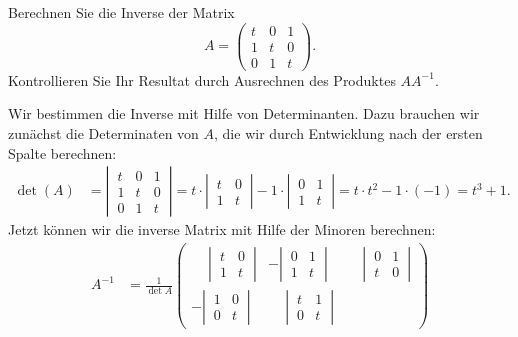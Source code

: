 Berechnen Sie die Inverse der Matrix
\[
A
=
\begin{pmatrix}
t&0&1\\
1&t&0\\
0&1&t
\end{pmatrix}.
\]
Kontrollieren Sie Ihr Resultat durch Ausrechnen des Produktes $AA^{-1}$.


\begin{loesung}
Wir bestimmen die Inverse mit Hilfe von Determinanten.
Dazu brauchen wir zunächst die Determinaten von $A$, die wir durch Entwicklung
nach der ersten Spalte berechnen:
\begin{align*}
\det(A)
&=
\left|\,\begin{matrix}
t&0&1\\
1&t&0\\
0&1&t
\end{matrix}\,\right|
=
t\cdot\left|\,\begin{matrix}t&0\\1&t\end{matrix}\,\right|
-1\cdot\left|\,\begin{matrix}0&1\\1&t\end{matrix}\,\right|
=
t\cdot t^2-1\cdot(-1)=t^3+1.
\end{align*}
Jetzt können wir die inverse Matrix mit Hilfe der Minoren berechnen:
\begin{align}
A^{-1}
&=
\frac1{\det{A}}\begin{pmatrix}
\phantom{-}\left|\,\begin{matrix}t&0\\1&t\end{matrix}\,\right|
	&-\left|\,\begin{matrix}0&1\\1&t\end{matrix}\,\right|
		&\phantom{-}\left|\,\begin{matrix}0&1\\t&0\end{matrix}\,\right|
			\\[11pt]
-\left|\,\begin{matrix}1&0\\0&t\end{matrix}\,\right|
	&\phantom{-}\left|\,\begin{matrix}t&1\\0&t\end{matrix}\,\right|

\end{pmatrix}
\end{align}
\end{loesung}
